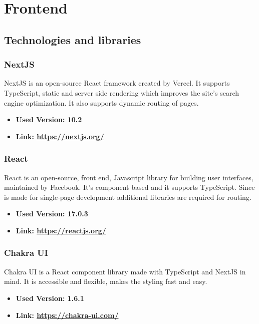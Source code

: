 \section{Frontend}
\subsection{Technologies and libraries}
\subsubsection{NextJS}
NextJS is an open-source React framework created by Vercel. It supports TypeScript, static and server side rendering which improves the site's search engine optimization. It also supports dynamic routing of pages.
\begin{itemize}
  \item \textbf{Used Version: 10.2}
  \item \textbf{Link: \url{https://nextjs.org/}}
\end{itemize}
\subsubsection{React}
React is an open-source, front end, Javascript library for building user interfaces, maintained by Facebook. It's component based and it supports TypeScript. Since is made for single-page development additional libraries are required for routing.
\begin{itemize}
  \item \textbf{Used Version: 17.0.3}
  \item \textbf{Link: \url{https://reactjs.org/}}
\end{itemize}
\subsubsection{Chakra UI}
Chakra UI is a React component library made with TypeScript and NextJS in mind. It is accessible and flexible, makes the styling fast and easy.
\begin{itemize}
  \item \textbf{Used Version: 1.6.1}
  \item \textbf{Link: \url{https://chakra-ui.com/}}
\end{itemize}

